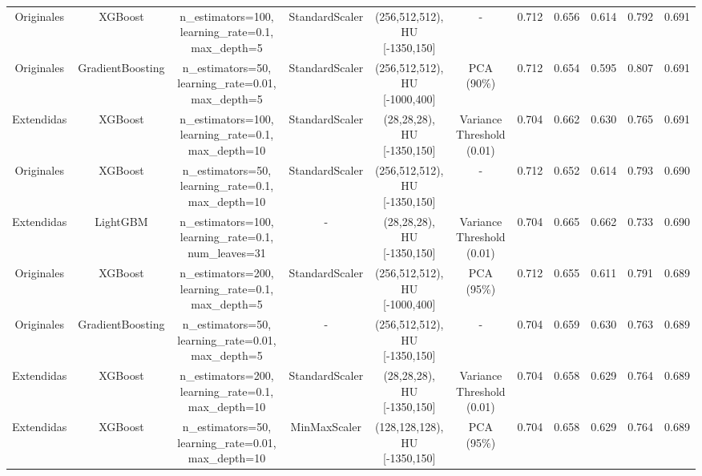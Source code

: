 \begin{sidewaystable}[!htbp]
{\begin{tabular}{ccccccccccc}
Originales & XGBoost & n\_estimators=100, learning\_rate=0.1, max\_depth=5 & StandardScaler & (256,512,512), HU [-1350,150] & - & 0.712 & 0.656 & 0.614 & 0.792 & 0.691 \\
Originales & GradientBoosting & n\_estimators=50, learning\_rate=0.01, max\_depth=5 & StandardScaler & (256,512,512), HU [-1000,400] & PCA (90\%) & 0.712 & 0.654 & 0.595 & 0.807 & 0.691 \\
Extendidas & XGBoost & n\_estimators=100, learning\_rate=0.1, max\_depth=10 & StandardScaler & (28,28,28), HU [-1350,150] & Variance Threshold (0.01) & 0.704 & 0.662 & 0.630 & 0.765 & 0.691 \\
Originales & XGBoost & n\_estimators=50, learning\_rate=0.1, max\_depth=10 & StandardScaler & (256,512,512), HU [-1350,150] & - & 0.712 & 0.652 & 0.614 & 0.793 & 0.690 \\
Extendidas & LightGBM & n\_estimators=100, learning\_rate=0.1, num\_leaves=31 & - & (28,28,28), HU [-1350,150] & Variance Threshold (0.01) & 0.704 & 0.665 & 0.662 & 0.733 & 0.690 \\
Originales & XGBoost & n\_estimators=200, learning\_rate=0.1, max\_depth=5 & StandardScaler & (256,512,512), HU [-1000,400] & PCA (95\%) & 0.712 & 0.655 & 0.611 & 0.791 & 0.689 \\
Originales & GradientBoosting & n\_estimators=50, learning\_rate=0.01, max\_depth=5 & - & (256,512,512), HU [-1350,150] & - & 0.704 & 0.659 & 0.630 & 0.763 & 0.689 \\
Extendidas & XGBoost & n\_estimators=200, learning\_rate=0.1, max\_depth=10 & StandardScaler & (28,28,28), HU [-1350,150] & Variance Threshold (0.01) & 0.704 & 0.658 & 0.629 & 0.764 & 0.689 \\
Extendidas & XGBoost & n\_estimators=50, learning\_rate=0.01, max\_depth=10 & MinMaxScaler & (128,128,128), HU [-1350,150] & PCA (95\%) & 0.704 & 0.658 & 0.629 & 0.764 & 0.689 \\
\bottomrule
\end{tabular}%
}
\end{sidewaystable}


